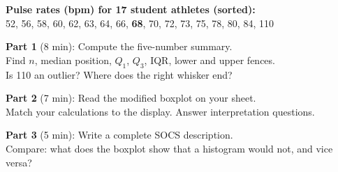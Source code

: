 \documentclass[aspectratio=169, 11pt]{beamer}
\begin{document}
{
\begin{frame}[t, plain]
  \vspace{0.45cm}\par
  \hspace{0.55cm}%
  \begin{minipage}{0.9\textwidth}

    \small
    \textbf{Pulse rates (bpm) for 17 student athletes (sorted):}\\[0.3em]
    52, 56, 58, 60, 62, 63, 64, 66, \textbf{68}, 70, 72, 73, 75, 78, 80, 84, 110

    \vspace{0.6em}
    \textbf{Part 1} (8 min): Compute the five-number summary.\\
    Find $n$, median position, $Q_1$, $Q_3$, IQR, lower and upper fences.\\
    Is 110 an outlier? Where does the right whisker end?

    \vspace{0.4em}
    \textbf{Part 2} (7 min): Read the modified boxplot on your sheet.\\
    Match your calculations to the display. Answer interpretation questions.

    \vspace{0.4em}
    \textbf{Part 3} (5 min): Write a complete SOCS description.\\
    Compare: what does the boxplot show that a histogram would not, and vice versa?
  \end{minipage}
\end{frame}
}
\end{document}
